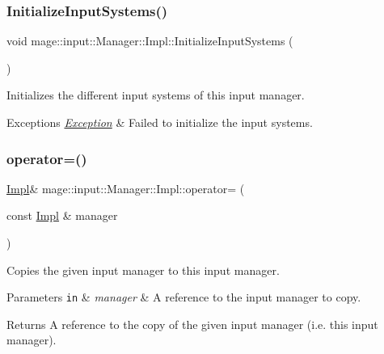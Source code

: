 \subsubsection{\texorpdfstring{Initialize\+Input\+Systems()}{InitializeInputSystems()}}
{\footnotesize\ttfamily void mage\+::input\+::\+Manager\+::\+Impl\+::\+Initialize\+Input\+Systems (\begin{DoxyParamCaption}{ }\end{DoxyParamCaption})\hspace{0.3cm}{\ttfamily [private]}}

Initializes the different input systems of this input manager.


\begin{DoxyExceptions}{Exceptions}
{\em \mbox{\hyperlink{classmage_1_1_exception}{Exception}}} & Failed to initialize the input systems. \\
\hline
\end{DoxyExceptions}
\mbox{\label{classmage_1_1input_1_1_manager_1_1_impl_a1b60284e1656b2a864bb29580c7a0107}} 
\subsubsection{\texorpdfstring{operator=()}{operator=()}\hspace{0.1cm}{\footnotesize\ttfamily [1/2]}}
{\footnotesize\ttfamily \mbox{\hyperlink{classmage_1_1input_1_1_manager_1_1_impl}{Impl}}\& mage\+::input\+::\+Manager\+::\+Impl\+::operator= (\begin{DoxyParamCaption}\item[{const \mbox{\hyperlink{classmage_1_1input_1_1_manager_1_1_impl}{Impl}} \&}]{manager }\end{DoxyParamCaption})\hspace{0.3cm}{\ttfamily [delete]}}

Copies the given input manager to this input manager.


\begin{DoxyParams}[1]{Parameters}
\mbox{\tt in}  & {\em manager} & A reference to the input manager to copy. \\
\hline
\end{DoxyParams}
\begin{DoxyReturn}{Returns}
A reference to the copy of the given input manager (i.\+e. this input manager). 
\end{DoxyReturn}
\mbox{\label{classmage_1_1input_1_1_manager_1_1_impl_a0dcf4b3269e6cd96b9c5864663c86322}} 
